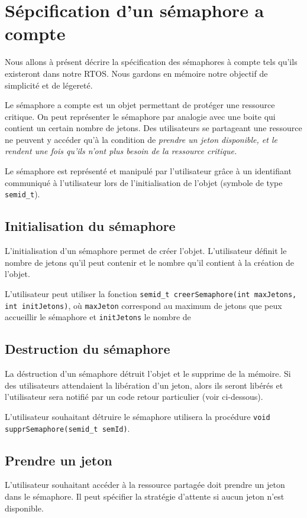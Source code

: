 \section{Sépcification d'un sémaphore a compte}

Nous allons à présent décrire la spécification des sémaphores à compte tels
qu'ils existeront dans notre RTOS. Nous gardons en mémoire notre objectif de
simplicité et de légereté.

Le sémaphore a compte est un objet permettant de protéger une ressource
critique. On peut représenter le sémaphore par analogie avec une boite qui
contient un certain nombre de jetons. Des utilisateurs se partageant une
ressource ne peuvent y accéder qu'à la condition de \em{prendre} un jeton
disponible, et le \em{rendent} une fois qu'ils n'ont plus besoin de la
ressource critique.

Le sémaphore est représenté et manipulé par l'utilisateur grâce à un
identifiant communiqué à l'utilisateur lors de l'initialisation de l'objet
(symbole de type \texttt{semid_t}).

\subsection{Initialisation du sémaphore}

L'initialisation d'un sémaphore permet de créer l'objet. L'utilisateur définit le nombre de jetons qu'il peut contenir et le nombre qu'il contient à la création de l'objet.

L'utilisateur peut utiliser la fonction \texttt{semid_t creerSemaphore(int maxJetons,
int initJetons)}, où \texttt{maxJeton} correspond au maximum de jetons que peux accueillir le sémaphore et \texttt{initJetons} le nombre de 

\subsection{Destruction du sémaphore}
La déstruction d'un sémaphore détruit l'objet et le supprime de la mémoire. Si des utilisateurs attendaient la libération d'un jeton, alors ils seront libérés et l'utilisateur sera notifié par un code retour particulier (voir ci-dessous).

L'utilisateur souhaitant détruire le sémaphore utilisera la procédure \texttt{void supprSemaphore(semid_t semId)}.

\subsection{Prendre un jeton}
L'utilisateur souhaitant accéder à la ressource partagée doit prendre un jeton
dans le sémaphore. Il peut spécifier la stratégie d'attente si aucun jeton
n'est disponible.

